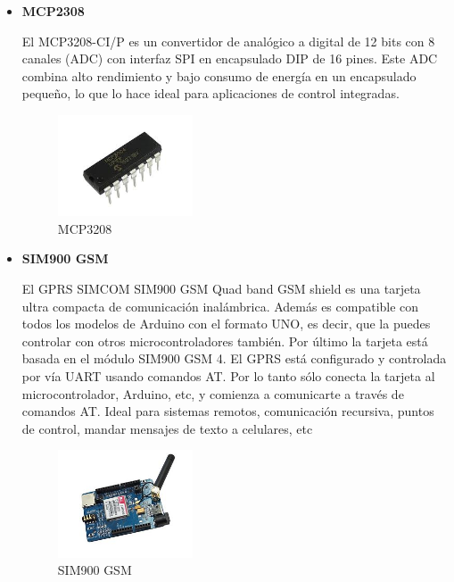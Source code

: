 \documentclass[letterpaper,12pt]{article}
\begin{document}
{\begin{itemize}
\begin{figure}[h]
			\end{figure}
			
			
			\item \textbf{MCP2308}
			
			El MCP3208-CI/P es un convertidor de analógico a digital de 12 bits con 8 canales (ADC) con interfaz SPI en encapsulado DIP de 16 pines. Este ADC combina alto rendimiento y bajo consumo de energía en un encapsulado pequeño, lo que lo hace ideal para aplicaciones de control integradas.
			
			\begin{figure}[h]
				\centering
				\begin{minipage}[t]{5cm}
					\includegraphics[width=4cm]{images/mcp3208.jpeg}	 %
					\caption{MCP3208 }
				\end{minipage}
				
			\end{figure}
			\newpage
			\item \textbf{SIM900 GSM}

			El GPRS SIMCOM SIM900 GSM Quad band GSM shield es una tarjeta ultra compacta de comunicación inalámbrica. Además es compatible con todos los modelos de Arduino con el formato UNO, es decir, que la puedes controlar con otros microcontroladores también. Por último la tarjeta está basada en el módulo SIM900 GSM 4. El  GPRS está configurado y controlada por vía UART usando comandos AT. Por lo tanto sólo conecta la tarjeta al microcontrolador, Arduino, etc, y comienza a comunicarte a través de comandos AT. Ideal para sistemas remotos, comunicación recursiva, puntos de control, mandar mensajes de texto a celulares, etc
			
			\begin{figure}[h]
				\centering
				\begin{minipage}[t]{5cm}
					\includegraphics[width=4cm]{images/sim900.jpg}	 %
					\caption{SIM900 GSM}
				\end{minipage}
				

\end{figure}
\end{itemize}}
\end{document}
